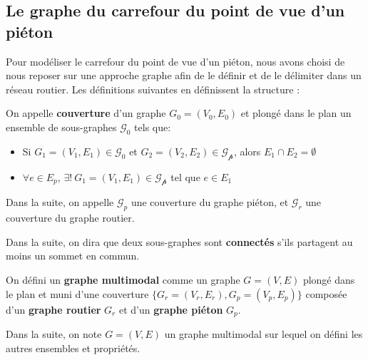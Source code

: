 

\subsection{Le graphe du carrefour du point de vue d'un piéton}

\label{sec:modelisation_definitions}

Pour modéliser le carrefour du point de vue d'un piéton, nous avons choisi de nous reposer sur une approche graphe afin de le définir et de le délimiter dans un réseau routier. Les définitions suivantes en définissent la structure :

\begin{definition}
    On appelle \textbf{couverture} d'un graphe $G_0 = (V_0,E_0)$ et plongé dans le plan un ensemble de sous-graphes $\mathcal{G_0}$ tels que:
    \begin{itemize}
        \item Si $G_1=(V_1, E_1) \in \mathcal{G_0}$ et $G_2=(V_2, E_2) \in \mathcal{G_p}$, alors $E_1 \cap E_2 = \emptyset$
        \item $\forall e \in E_p$, $\exists!~G_1=(V_1, E_1) \in \mathcal{G_p}$ tel que $e \in E_1$
    \end{itemize}
    
    Dans la suite, on appelle $\mathcal{G}_p$ une couverture du graphe piéton, et $\mathcal{G}_r$ une couverture du graphe routier.
    
    Dans la suite, on dira que deux sous-graphes sont \textbf{connectés} s'ils partagent au moins un sommet en commun.
\end{definition}

\begin{definition}
    On défini un \textbf{graphe multimodal} comme un graphe $G = (V,E)$ plongé dans le plan et muni d'une couverture $\{G_r=(V_r, E_r), G_p = (V_p, E_p)\}$ composée d'un \textbf{graphe routier} $G_r$ et d'un \textbf{graphe piéton} $G_p$.

    Dans la suite, on note $G = (V,E)$ un graphe multimodal sur lequel on défini les autres ensembles et propriétés.
\end{definition}

